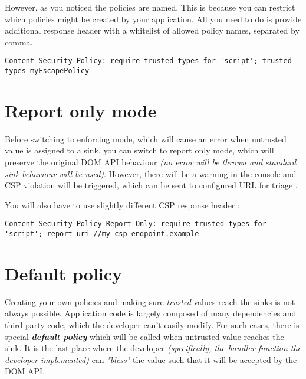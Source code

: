 However, as you noticed the policies are named. This is because you can restrict which policies
might be created by your application. All you need to do is provide additional response header with
a whitelist of allowed policy names, separated by comma.

\bigskip
\begin{lstlisting}[language={}, caption={Restricting policy names}]
  Content-Security-Policy: require-trusted-types-for 'script'; trusted-types myEscapePolicy
\end{lstlisting}

\section{Report only mode}

Before switching to enforcing mode, which will cause an error when untrusted value is assigned to a
sink, you can switch to report only mode, which will preserve the original DOM API behaviour
\emph{(no error will be thrown and standard sink behaviour will be used)}. However, there will be a
warning in the console and CSP violation will be triggered, which can be sent to configured URL for
triage \cite{tt_intro_csp_violation}.

You will also have to use slightly different CSP response header \cite{trusted_types_into}:

\bigskip
\begin{lstlisting}[language={}, caption={Report only CSP}]
  Content-Security-Policy-Report-Only: require-trusted-types-for 'script'; report-uri //my-csp-endpoint.example
\end{lstlisting}

\section{Default policy}

Creating your own policies and making sure \emph{trusted} values reach the sinks is not always
possible. Application code is largely composed of many dependencies and third party code, which the
developer can't easily modify. For such cases, there is special \emph{\textbf{default policy}} which
will be called when untrusted value reaches the sink. It is the last place where the developer
\emph{(specifically, the handler function the developer implemented)} can \emph{"bless"} the value
such that it will be accepted by the DOM API. \cite{trusted_types_into}

